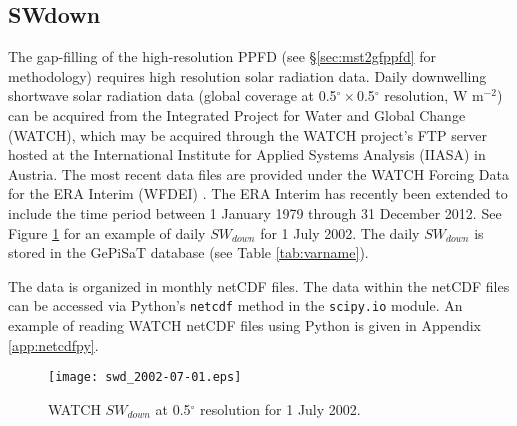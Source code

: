 \subsection{SWdown}
\label{sec:gepwatch}
The gap-filling of the high-resolution PPFD (see \S \ref{sec:mst2gfppfd} for methodology) requires high resolution solar radiation data.  
Daily downwelling shortwave solar radiation data (global coverage at 0.5$^{\circ}\times$0.5$^\circ$ resolution, W m$^{-2}$) can be acquired from the Integrated Project for Water and Global Change (WATCH\footnotemark {}), which may be acquired through the WATCH project's FTP server hosted at the International Institute for Applied Systems Analysis (IIASA) in Austria\footnotemark {}.
The most recent data files are provided under the WATCH Forcing Data for the ERA Interim (WFDEI) \parencite{weedon12}.  
The ERA Interim has recently been extended to include the time period between 1 January 1979 through 31 December 2012.
See Figure \ref{fig:watchswd} for an example of daily $SW_{down}$ for 1 July 2002.
The daily $SW_{down}$ is stored in the GePiSaT database (see Table \ref{tab:varname}).

The data is organized in monthly netCDF files.  
The data within the netCDF files can be accessed via Python's \texttt{netcdf} method in the \texttt{scipy.io} module.  
An example of reading WATCH netCDF files using Python is given in Appendix \ref{app:netcdfpy}.
\begin{figure}[h!]
    \texttt{[image: swd\_2002-07-01.eps]}
    \caption{WATCH $SW_{down}$ at 0.5$^{\circ}$ resolution for 1 July 
    2002.}
    \label{fig:watchswd}
\end{figure}

